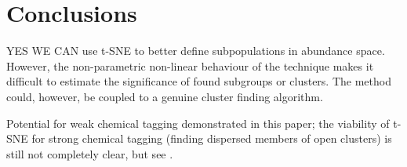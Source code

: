 \documentclass{aa}  %
\begin{document}
% 
% 
% 
% 
% 
% 
% 
% 
% 

\section{Conclusions}\label{conclusions}

YES WE CAN use t-SNE to better define subpopulations in abundance space. However, the non-parametric non-linear behaviour of the technique makes it difficult to estimate the significance of found subgroups or clusters. The method could, however, be coupled to a genuine cluster finding algorithm.

Potential for weak chemical tagging demonstrated in this paper; the viability of t-SNE for strong chemical tagging (finding dispersed members of open clusters) is still not completely clear, but see \citet{Kos2017}.
\end{document}
